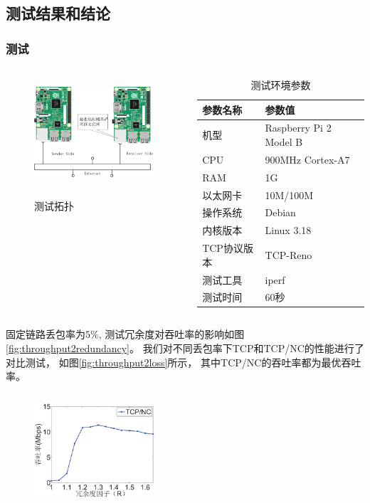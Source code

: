 \subsection{测试结果和结论}
\begin{frame}[allowframebreaks]
	\frametitle{测试}
	\begin{columns}
		\begin{column}{0.4\textwidth}
			\begin{figure}
				\includegraphics[height=4cm]{../figures/tuopu.eps}
				\label{fig:tuopu}
				\caption{测试拓扑}
			\end{figure}
		\end{column}
		\begin{column}{0.6\textwidth}
			\vspace{-1.5em}
			\begin{table}[htp]
				\centering
				\caption{测试环境参数}
				\label{tab:ceshicanshu}
				\begin{tabular}{ll}
					\toprule
					参数名称&参数值\tabularnewline
					\midrule
					机型		&Raspberry Pi 2 Model B\tabularnewline
					CPU		&900MHz Cortex-A7\tabularnewline
					RAM			&1G\tabularnewline
					以太网卡 	&10M/100M\tabularnewline
					操作系统 &Debian\tabularnewline
					内核版本 &Linux 3.18\tabularnewline
					TCP协议版本 &TCP-Reno\tabularnewline
					测试工具 &iperf\tabularnewline
					测试时间 &60秒\tabularnewline
					\bottomrule
				\end{tabular}
			\end{table}
		\end{column}
	\end{columns}
	\newpage
	固定链路丢包率为$5\%$,
	测试冗余度对吞吐率的影响如图\ref{fig:throughput2redundancy}。
	我们对不同丢包率下TCP和TCP/NC的性能进行了对比测试，
	如图\ref{fig:throughput2loss}所示，
	其中TCP/NC的吞吐率都为最优吞吐率。
	\begin{columns}
		\begin{column}{0.5\textwidth}
			\begin{figure}
				\includegraphics[height=3.5cm]{../figures/redundancy.eps}

\end{figure}
\end{column}
\end{columns}
\end{frame}
